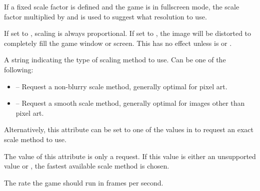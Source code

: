 \documentclass[letterpaper,10pt,english]{sphinxmanual}
\begin{document}
\begin{fulllineitems}
\begin{fulllineitems}
If a fixed scale factor is defined and the game is in fullscreen
mode, the scale factor multiplied by {\hyperref[dsp:sge.dsp.Game.width]{\emph{}}} and
{\hyperref[dsp:sge.dsp.Game.height]{\emph{}}} is used to suggest what resolution to use.

\end{fulllineitems}


\begin{fulllineitems}
\label{dsp:sge.dsp.Game.scale_proportional}
If set to , scaling is always proportional.  If set
to , the image will be distorted to completely fill
the game window or screen.  This has no effect unless
{\hyperref[dsp:sge.dsp.Game.scale]{\emph{}}} is  or .

\end{fulllineitems}


\begin{fulllineitems}
\label{dsp:sge.dsp.Game.scale_method}
A string indicating the type of scaling method to use.  Can be
one of the following:
\begin{itemize}
\item {} 
 -- Request a non-blurry scale method, generally
optimal for pixel art.

\item {} 
 -- Request a smooth scale method, generally
optimal for images other than pixel art.

\end{itemize}

Alternatively, this attribute can be set to one of the values in
 to request an exact scale method to
use.

The value of this attribute is only a request.  If this value is
either an unsupported value or , the fastest
available scale method is chosen.

\end{fulllineitems}


\begin{fulllineitems}
\label{dsp:sge.dsp.Game.fps}
The rate the game should run in frames per second.


\end{fulllineitems}
\end{fulllineitems}
\end{document}
